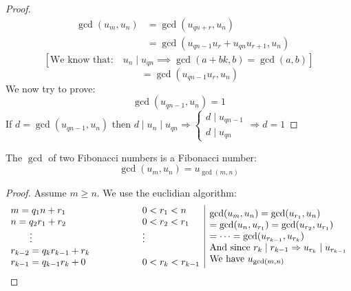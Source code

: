 \documentclass{report}
\begin{document}
\begin{proof}
			\[\begin{array}{lcl}
				&\gcd(u_m,u_n)&=\gcd(u_{qn+r},u_n)\\
				&&=\gcd(u_{qn-1}u_r+u_{qn}u_{r+1},u_n)
				\end{array}\]
			\[\left [
				\text{We know that:} \quad u_n\mid u_{qn} \implies \gcd(a+bk,b)=\gcd(a,b)
				\right ] \]
			\[\qquad \;=\gcd(u_{qn-1}u_r,u_n)\]
			We now try to prove: \[\gcd(u_{qn-1},u_n)=1\]
			If $d=\gcd(u_{qn-1},u_n)$ then $d\mid u_n \mid u_{qn} \Rightarrow 	\left\{
																																				\begin{array}{lcl}
																																				d \mid u_{qn-1}\\
																																				d \mid u_{qn}
																																				\end{array}
																																				\right. \Rightarrow d=1$
\end{proof}
\begin{thm} The $\gcd$ of two Fibonacci numbers is a Fibonacci number: \[\gcd(u_m,u_n)=u_{\gcd(m,n)}\]
\end{thm}
\begin{proof} Assume $m\geq n$. We use the euclidian algorithm:
							\[\begin{array}{lcl}
								m=q_1n+r_1 \qquad && \qquad 0<r_1<n\\
								n=q_2r_1+r_2\qquad && \qquad 0<r_2<r_1\\
									\qquad	\vdots  &&   \qquad \vdots\\
								r_{k-2}=q_kr_{k-1}+r_k&&\\
								r_{k-1}=q_{k-1}r_k+0\qquad  && \qquad 0 <r_k<r_{k-1}
								\end{array}
								\vline
								\begin{array}{lcl}
												\gcd(u_m,u_n)=\gcd(u_{r_1},u_n)\\
												=\gcd(u_n,u_{r_1})=\gcd(u_{r_2},u_{r_1})\\
												=\dots =\gcd(u_{r_{k-1}},u_{r_k})\\
												\text{And since  } r_k\mid r_{k-1} \Rightarrow u_{r_k}\mid u_{r_{k-1}}\\
												\text{We have } u_{\gcd(m,n)}
								\end{array}\]
\end{proof}

\newpage
\end{document}
